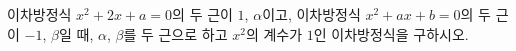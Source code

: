 이차방정식 $x^2+2x+a=0$의 두 근이 $1$, $\alpha$이고, 이차방정식 $x^2+ax+b=0$의 두 근이 $-1$, $\beta$일 때, $\alpha$, $\beta$를 두 근으로 하고 $x^2$의 계수가 $1$인 이차방정식을 구하시오. 
